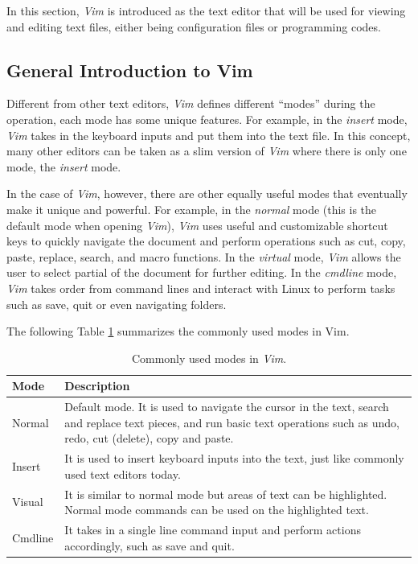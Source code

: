 In this section, \textit{Vim} is introduced as the text editor that will be used for viewing and editing text files, either being configuration files or programming codes.

\subsection{General Introduction to Vim} \label{ch3:subsec:vimgeneralintro}

Different from other text editors, \textit{Vim} defines different ``modes'' during the operation, each mode has some unique features. For example, in the \textit{insert} mode, \textit{Vim} takes in the keyboard inputs and put them into the text file. In this concept, many other editors can be taken as a slim version of \textit{Vim} where there is only one mode, the \textit{insert} mode.

In the case of \textit{Vim}, however, there are other equally useful modes that eventually make it unique and powerful. For example, in the \textit{normal} mode (this is the default mode when opening \textit{Vim}), \textit{Vim} uses useful and customizable shortcut keys to quickly navigate the document and perform operations such as cut, copy, paste, replace, search, and macro functions. In the \textit{virtual} mode, \textit{Vim} allows the user to select partial of the document for further editing. In the \textit{cmdline} mode, \textit{Vim} takes order from command lines and interact with Linux to perform tasks such as save, quit or even navigating folders.

The following Table \ref{ch3tab:vimmodes} summarizes the commonly used modes in Vim.
\begin{table}
  \centering \caption{Commonly used modes in \textit{Vim}.}\label{ch3tab:vimmodes}
  \begin{tabularx}{\textwidth}{lX}
    \hline
    Mode & Description \\ \hline
    Normal & Default mode. It is used to navigate the cursor in the text, search and replace text pieces, and run basic text operations such as undo, redo, cut (delete), copy and paste. \\ \hdashline
    Insert & It is used to insert keyboard inputs into the text, just like commonly used text editors today. \\ \hdashline
    Visual & It is similar to normal mode but areas of text can be highlighted. Normal mode commands can be used on the highlighted text. \\ \hdashline
    Cmdline & It takes in a single line command input and perform actions accordingly, such as save and quit. \\
    \hline
  \end{tabularx}
\end{table}

